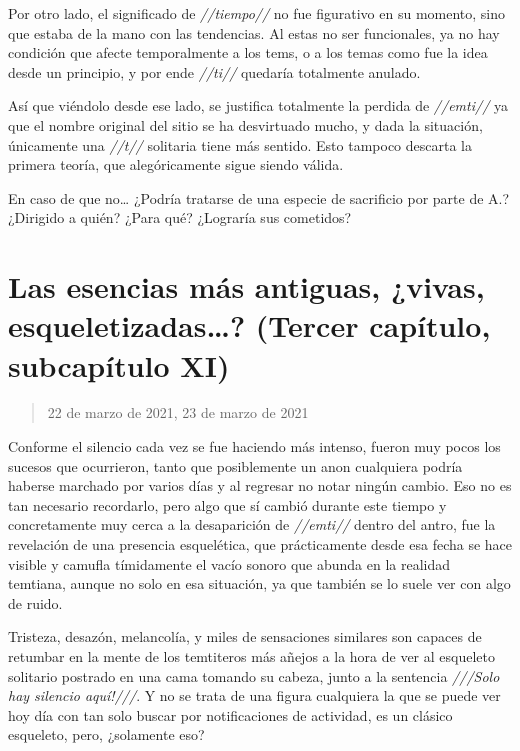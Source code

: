 \documentclass[
  spanish,
]{book}
\begin{document}
Por otro lado, el significado de \emph{//tiempo//} no fue figurativo en su momento, sino que estaba de la mano con las tendencias. Al estas no ser funcionales, ya no hay condición que afecte temporalmente a los tems, o a los temas como fue la idea desde un principio, y por ende \emph{//ti//} quedaría totalmente anulado.

Así que viéndolo desde ese lado, se justifica totalmente la perdida de \emph{//emti//} ya que el nombre original del sitio se ha desvirtuado mucho, y dada la situación, únicamente una \emph{//t//} solitaria tiene más sentido. Esto tampoco descarta la primera teoría, que alegóricamente sigue siendo válida.

En caso de que no\ldots{} ¿Podría tratarse de una especie de sacrificio por parte de A.? ¿Dirigido a quién? ¿Para qué? ¿Lograría sus cometidos?

\hypertarget{las-esencias-muxe1s-antiguas-vivas-esqueletizadas-tercer-capuxedtulo-subcapuxedtulo-xi}{%
\section{Las esencias más antiguas, ¿vivas, esqueletizadas\ldots? (Tercer capítulo, subcapítulo XI)}\label{las-esencias-muxe1s-antiguas-vivas-esqueletizadas-tercer-capuxedtulo-subcapuxedtulo-xi}}

\begin{quote}
22 de marzo de 2021, 23 de marzo de 2021
\end{quote}

Conforme el silencio cada vez se fue haciendo más intenso, fueron muy pocos los sucesos que ocurrieron, tanto que posiblemente un anon cualquiera podría haberse marchado por varios días y al regresar no notar ningún cambio. Eso no es tan necesario recordarlo, pero algo que sí cambió durante este tiempo y concretamente muy cerca a la desaparición de \emph{//emti//} dentro del antro, fue la revelación de una presencia esquelética, que prácticamente desde esa fecha se hace visible y camufla tímidamente el vacío sonoro que abunda en la realidad temtiana, aunque no solo en esa situación, ya que también se lo suele ver con algo de ruido.

Tristeza, desazón, melancolía, y miles de sensaciones similares son capaces de retumbar en la mente de los temtiteros más añejos a la hora de ver al esqueleto solitario postrado en una cama tomando su cabeza, junto a la sentencia \emph{///Solo hay silencio aquí!///}. Y no se trata de una figura cualquiera la que se puede ver hoy día con tan solo buscar por notificaciones de actividad, es un clásico esqueleto, pero, ¿solamente eso?
\end{document}

